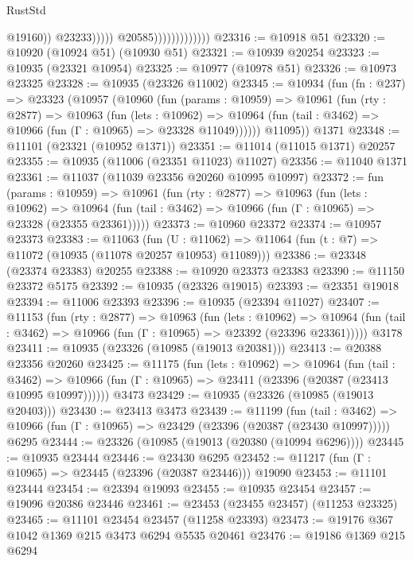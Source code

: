 \begin{lexlean}{RustStd}
\begin{coremodule}
{\begin{coremodule}
{{{{{{{{{{{{{{{{{{{{{{{{{{{{{{{{{{{{{{{{{{{{{{{{{{{{{{{{{{{{{{{{{{{{{{{{{{{{{{{{{{{{{                                            @19160))
                                        @23233)))))
                              @20585)))))))))))))
@23316 := @10918 @51
@23320 := @10920 (@10924 @51) (@10930 @51)
@23321 := @10939 @20254
@23323 := @10935 (@23321 @10954)
@23325 := @10977 (@10978 @51)
@23326 := @10973 @23325
@23328 := @10935 (@23326 @11002)
@23345 := @10934
    (fun (fn : @237) =>
    @23323
      (@10957
        (@10960
          (fun (params : @10959) =>
          @10961
            (fun (rty : @2877) =>
            @10963
              (fun (lets : @10962) =>
              @10964 (fun (tail : @3462) => @10966 (fun (Γ : @10965) => @23328 @11049))))))
        @11095))
    @1371
@23348 := @11101 (@23321 (@10952 @1371))
@23351 := @11014 (@11015 @1371) @20257
@23355 := @10935 (@11006 (@23351 @11023) @11027)
@23356 := @11040 @1371
@23361 := @11037 (@11039 @23356 @20260 @10995 @10997)
@23372 := fun (params : @10959) =>
  @10961
    (fun (rty : @2877) =>
    @10963
      (fun (lets : @10962) =>
      @10964 (fun (tail : @3462) => @10966 (fun (Γ : @10965) => @23328 (@23355 @23361)))))
@23373 := @10960 @23372
@23374 := @10957 @23373
@23383 := @11063
    (fun (U : @11062) => @11064 (fun (t : @7) => @11072 (@10935 (@11078 @20257 @10953) @11089)))
@23386 := @23348 (@23374 @23383) @20255
@23388 := @10920 @23373 @23383
@23390 := @11150 @23372 @5175
@23392 := @10935 (@23326 @19015)
@23393 := @23351 @19018
@23394 := @11006 @23393
@23396 := @10935 (@23394 @11027)
@23407 := @11153
    (fun (rty : @2877) =>
    @10963
      (fun (lets : @10962) =>
      @10964 (fun (tail : @3462) => @10966 (fun (Γ : @10965) => @23392 (@23396 @23361)))))
    @3178
@23411 := @10935 (@23326 (@10985 (@19013 @20381)))
@23413 := @20388 @23356 @20260
@23425 := @11175
    (fun (lets : @10962) =>
    @10964
      (fun (tail : @3462) =>
      @10966 (fun (Γ : @10965) => @23411 (@23396 (@20387 (@23413 @10995 @10997))))))
    @3473
@23429 := @10935 (@23326 (@10985 (@19013 @20403)))
@23430 := @23413 @3473
@23439 := @11199
    (fun (tail : @3462) => @10966 (fun (Γ : @10965) => @23429 (@23396 (@20387 (@23430 @10997)))))
    @6295
@23444 := @23326 (@10985 (@19013 (@20380 (@10994 @6296))))
@23445 := @10935 @23444
@23446 := @23430 @6295
@23452 := @11217 (fun (Γ : @10965) => @23445 (@23396 (@20387 @23446))) @19090
@23453 := @11101 @23444
@23454 := @23394 @19093
@23455 := @10935 @23454
@23457 := @19096 @20386 @23446
@23461 := @23453 (@23455 @23457) (@11253 @23325)
@23465 := @11101 @23454 @23457 (@11258 @23393)
@23473 := @19176 @367 @1042 @1369 @215 @3473 @6294 @5535 @20461
@23476 := @19186 @1369 @215 @6294
}}}}}}}}}}}}}}}}}}}}}}}}}}}}}}}}}}}}}}}}}}}}}}}}}}}}}}}}}}}}}}}}}}}}}}}}}}}}}}}}}}}}}
\end{coremodule}}
\end{coremodule}
\end{lexlean}
